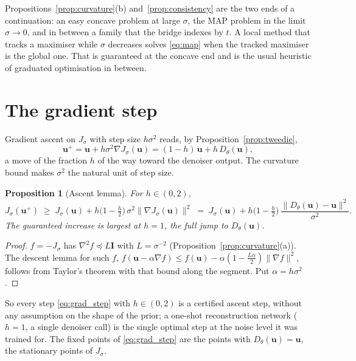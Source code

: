 \documentclass[11pt]{article}
\newtheorem{proposition}{Proposition}
\theoremstyle{definition}
\theoremstyle{remark}
\newcommand{\uu}{\bm{u}}
\newcommand{\Id}{\bm{I}}
\newcommand{\D}{D_\theta}
\newcommand{\grad}{\nabla}
\begin{document}
Propositions~\ref{prop:curvature}(b) and~\ref{prop:consistency} are the two ends of a
continuation: an easy concave problem at large $\sigma$, the MAP problem in the limit
$\sigma\to0$, and in between a family that the bridge indexes by $t$. A local method that
tracks a maximiser while $\sigma$ decreases solves \eqref{eq:map} when the tracked maximiser
is the global one. That is guaranteed at the concave end and is the usual heuristic of
graduated optimisation in between.

\section{The gradient step}

Gradient ascent on $J_\sigma$ with step size $h\sigma^2$ reads, by
Proposition~\ref{prop:tweedie},
\begin{equation}
  \uu^+ = \uu + h\sigma^2\grad J_\sigma(\uu) = (1-h)\,\uu + h\,\D(\uu),
  \label{eq:grad_step}
\end{equation}
a move of the fraction $h$ of the way toward the denoiser output. The curvature bound makes
$\sigma^2$ the natural unit of step size.

\begin{proposition}[Ascent lemma]\label{prop:ascent}
For $h\in(0,2)$,
\[
  J_\sigma(\uu^+) \;\ge\; J_\sigma(\uu) + h\big(1-\tfrac h2\big)\,\sigma^2\|\grad J_\sigma(\uu)\|^2
  \;=\; J_\sigma(\uu) + h\big(1-\tfrac h2\big)\,\frac{\|\D(\uu)-\uu\|^2}{\sigma^2}.
\]
The guaranteed increase is largest at $h=1$, the full jump to $\D(\uu)$.
\end{proposition}
\begin{proof}
$f = -J_\sigma$ has $\grad^2 f\preceq L\Id$ with $L = \sigma^{-2}$
(Proposition~\ref{prop:curvature}(a)). The descent lemma for such $f$,
$f(\uu - \alpha\grad f) \le f(\uu) - \alpha(1-\tfrac{L\alpha}{2})\|\grad f\|^2$, follows
from Taylor's theorem with that bound along the segment. Put $\alpha = h\sigma^2$.
\end{proof}

So every step \eqref{eq:grad_step} with $h\in(0,2)$ is a certified ascent step, without any
assumption on the shape of the prior; a one-shot reconstruction network ($h=1$, a single
denoiser call) is the single optimal step at the noise level it was trained for. The fixed
points of \eqref{eq:grad_step} are the points with $\D(\uu)=\uu$, the stationary points of
$J_\sigma$.
\end{document}
